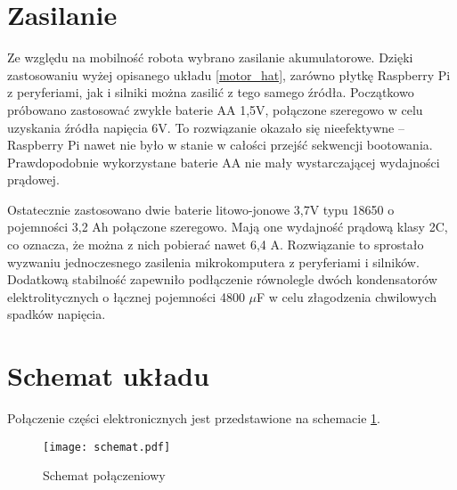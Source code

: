 \section{Zasilanie}
Ze względu na mobilność robota wybrano zasilanie akumulatorowe.
Dzięki zastosowaniu wyżej opisanego układu \ref{motor_hat}, zarówno płytkę Raspberry Pi z peryferiami, jak i silniki można zasilić z tego samego źródła.
Początkowo próbowano zastosować zwykłe baterie AA 1,5V, połączone szeregowo w celu uzyskania źródła napięcia 6V.
To rozwiązanie okazało się nieefektywne -- Raspberry Pi nawet nie było w stanie w całości przejść sekwencji bootowania.
Prawdopodobnie wykorzystane baterie AA nie mały wystarczającej wydajności prądowej.

Ostatecznie zastosowano dwie baterie litowo-jonowe 3,7V typu 18650 o pojemności 3,2 Ah połączone szeregowo.
Mają one wydajność prądową klasy 2C, co oznacza, że można z nich pobierać nawet 6,4 A.
Rozwiązanie to sprostało wyzwaniu jednoczesnego zasilenia mikrokomputera z peryferiami i silników.
Dodatkową stabilność zapewniło podłączenie równolegle dwóch kondensatorów elektrolitycznych o łącznej pojemności 4800 $\mu$F w celu złagodzenia chwilowych spadków napięcia.

\section{Schemat układu}
Połączenie części elektronicznych jest przedstawione na schemacie \ref{rys:schemat}.
\begin{figure}[!hb]
    \centering \texttt{[image: schemat.pdf]}
    \caption{Schemat połączeniowy}
    \label{rys:schemat}
\end{figure}

